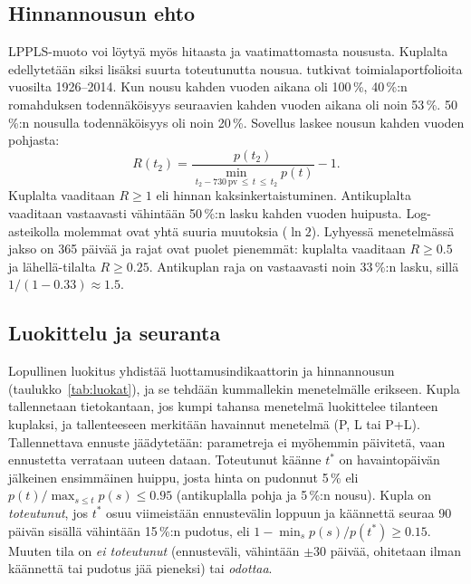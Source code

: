 \documentclass[10pt,a4paper]{article}
\newcommand{\pv}{\,\mathrm{pv}}
\begin{document}
\subsection{Hinnannousun ehto}\label{sec:nousu}

LPPLS-muoto voi löytyä myös hitaasta ja vaatimattomasta noususta. Kuplalta edellytetään siksi
lisäksi suurta toteutunutta nousua. \citet{greenwood2019} tutkivat toimialaportfolioita vuosilta
1926--2014. Kun nousu kahden vuoden aikana oli 100\,\%, 40\,\%:n romahduksen todennäköisyys
seuraavien kahden vuoden aikana oli noin 53\,\%. 50\,\%:n nousulla todennäköisyys oli noin
20\,\%. Sovellus laskee nousun kahden vuoden pohjasta:
\begin{equation}\label{eq:runup}
  R(t_2) = \frac{p(t_2)}{\displaystyle\min_{t_2-730\pv\,\le\, t\,\le\, t_2} p(t)} - 1 .
\end{equation}
Kuplalta vaaditaan $R \ge 1$ eli hinnan kaksinkertaistuminen. Antikuplalta vaaditaan vastaavasti
vähintään 50\,\%:n lasku kahden vuoden huipusta. Log-asteikolla molemmat ovat yhtä suuria
muutoksia ($\ln 2$). Lyhyessä menetelmässä jakso on 365 päivää ja rajat ovat puolet
pienemmät: kuplalta vaaditaan $R \ge 0.5$ ja lähellä-tilalta $R\ge0.25$. Antikuplan raja
on vastaavasti noin 33\,\%:n lasku, sillä $1/(1-0.33)\approx 1.5$.

\subsection{Luokittelu ja seuranta}

Lopullinen luokitus yhdistää luottamusindikaattorin ja hinnannousun
(taulukko~\ref{tab:luokat}), ja se tehdään kummallekin menetelmälle erikseen. Kupla
tallennetaan tietokantaan, jos kumpi tahansa menetelmä luokittelee tilanteen kuplaksi, ja
tallenteeseen merkitään havainnut menetelmä (P, L tai P+L).
Tallennettava ennuste jäädytetään: parametreja ei myöhemmin päivitetä, vaan ennustetta verrataan
uuteen dataan. Toteutunut käänne $t^*$ on havaintopäivän jälkeinen ensimmäinen huippu, josta hinta
on pudonnut 5\,\% eli $p(t)/\max_{s\le t} p(s) \le 0.95$ (antikuplalla pohja ja 5\,\%:n nousu).
Kupla on \emph{toteutunut}, jos $t^*$ osuu viimeistään ennustevälin loppuun ja käännettä seuraa 90
päivän sisällä vähintään 15\,\%:n pudotus, eli $1 - \min_s p(s)/p(t^*) \ge 0.15$. Muuten tila on
\emph{ei toteutunut} (ennusteväli, vähintään $\pm 30$ päivää, ohitetaan ilman käännettä tai pudotus
jää pieneksi) tai \emph{odottaa}.
\end{document}
